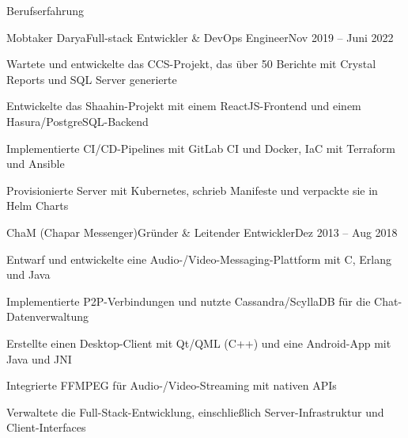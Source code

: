 \documentclass[]{main}
\begin{document}
\begin{section}{Berufserfahrung}
 \begin{subsection}{Mobtaker Darya}{Full-stack Entwickler \& DevOps Engineer}{Nov 2019 -- Juni 2022}{}
     \item Wartete und entwickelte das CCS-Projekt, das über 50 Berichte mit Crystal Reports und SQL Server generierte
     \item Entwickelte das Shaahin-Projekt mit einem ReactJS-Frontend und einem Hasura/PostgreSQL-Backend
     \item Implementierte CI/CD-Pipelines mit GitLab CI und Docker, IaC mit Terraform und Ansible
     \item Provisionierte Server mit Kubernetes, schrieb Manifeste und verpackte sie in Helm Charts
 \end{subsection}

 \begin{subsection}{ChaM (Chapar Messenger)}{Gründer \& Leitender Entwickler}{Dez 2013 -- Aug 2018}{}
     \item Entwarf und entwickelte eine Audio-/Video-Messaging-Plattform mit C, Erlang und Java
     \item Implementierte P2P-Verbindungen und nutzte Cassandra/ScyllaDB für die Chat-Datenverwaltung
     \item Erstellte einen Desktop-Client mit Qt/QML (C++) und eine Android-App mit Java und JNI
     \item Integrierte FFMPEG für Audio-/Video-Streaming mit nativen APIs
     \item Verwaltete die Full-Stack-Entwicklung, einschließlich Server-Infrastruktur und Client-Interfaces
 \end{subsection}
\end{section}

\end{document}
